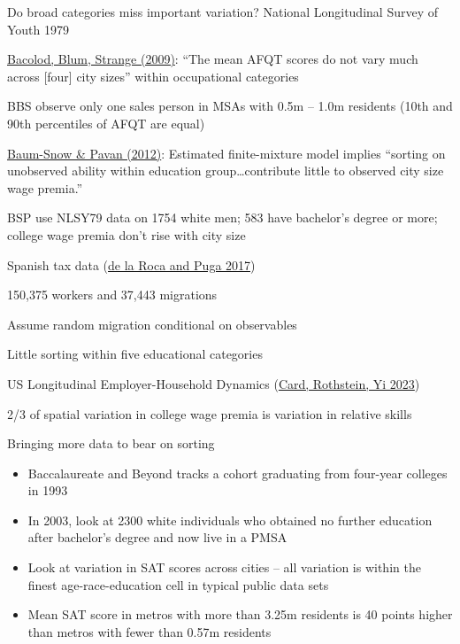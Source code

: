 \documentclass[11pt,notes=hide,aspectratio=169]{beamer}
\begin{document}
\begin{frame}{Do broad categories miss important variation?}
{\small National Longitudinal Survey of Youth 1979}
\begin{itemize}{\footnotesize
	\item \href{http://econpapers.repec.org/article/eeejuecon/v_3a65_3ay_3a2009_3ai_3a2_3ap_3a136-153.htm}{Bacolod, Blum, Strange (2009)}: ``The mean AFQT scores do not vary much across [four] city sizes'' within occupational categories
	\item BBS observe only one sales person in MSAs with 0.5m -- 1.0m residents (10th and 90th percentiles of AFQT are equal) \hyperlink{BBS2009tab5}{}
	\item \href{https://ideas.repec.org/a/oup/restud/v79y2012i1p88-127.html}{Baum-Snow \& Pavan (2012)}: Estimated finite-mixture model implies ``sorting on unobserved ability within education group\dots contribute little to observed city size wage premia.''
	\item BSP use NLSY79 data on 1754 white men; 583 have bachelor's degree or more; college wage premia don't rise with city size \hyperlink{BSPvsCensus}{}
}\end{itemize} 
{\small Spanish tax data (\href{https://academic.oup.com/restud/article/84/1/106/2669971}{de la Roca and Puga 2017})}
\begin{itemize}{\footnotesize
	\item 150,375 workers and 37,443 migrations
	\item Assume random migration conditional on observables
	\item Little sorting within five educational categories
}\end{itemize}
{\small US Longitudinal Employer-Household Dynamics (\href{https://www.nber.org/papers/w31587}{Card, Rothstein, Yi 2023})}
\begin{itemize}{\footnotesize
	\item 2/3 of spatial variation in college wage premia is variation in relative skills
}\end{itemize}
\hypertarget{NLSY_main}{}
\end{frame}
\begin{frame}{Bringing more data to bear on sorting}
\begin{itemize}
	\item Baccalaureate and Beyond tracks a cohort graduating from four-year colleges in 1993 
	\item In 2003, look at 2300 white individuals who obtained no further education after bachelor's degree and now live in a PMSA
	\item Look at variation in SAT scores across cities -- all variation is within the finest age-race-education cell in typical public data sets
	\item Mean SAT score in metros with more than 3.25m residents is 40 points higher than metros with fewer than 0.57m residents
\end{itemize}
\end{frame}
\end{document}
